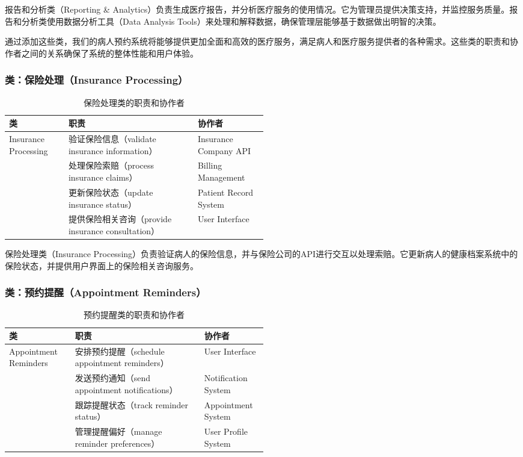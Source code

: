 报告和分析类（Reporting \& Analytics）负责生成医疗报告，并分析医疗服务的使用情况。它为管理员提供决策支持，并监控服务质量。报告和分析类使用数据分析工具（Data Analysis Tools）来处理和解释数据，确保管理层能够基于数据做出明智的决策。

通过添加这些类，我们的病人预约系统将能够提供更加全面和高效的医疗服务，满足病人和医疗服务提供者的各种需求。这些类的职责和协作者之间的关系确保了系统的整体性能和用户体验。

\subsubsection{类：保险处理（Insurance Processing）}
\begin{table}[htbp]
	\centering
	\begin{tabular}{|l|p{0.5\linewidth}|l|}
		\hline
		\textbf{类} & \textbf{职责} & \textbf{协作者} \\
		\hline
		Insurance Processing & 验证保险信息（validate insurance information） & Insurance Company API \\
		& 处理保险索赔（process insurance claims） & Billing Management \\
		& 更新保险状态（update insurance status） & Patient Record System \\
		& 提供保险相关咨询（provide insurance consultation） & User Interface \\
		\hline
	\end{tabular}
	\caption{保险处理类的职责和协作者}
	\label{tab:insurance_processing}
\end{table}

保险处理类（Insurance Processing）负责验证病人的保险信息，并与保险公司的API进行交互以处理索赔。它更新病人的健康档案系统中的保险状态，并提供用户界面上的保险相关咨询服务。

\subsubsection{类：预约提醒（Appointment Reminders）}
\begin{table}[htbp]
	\centering
	\begin{tabular}{|l|p{0.5\linewidth}|l|}
		\hline
		\textbf{类} & \textbf{职责} & \textbf{协作者} \\
		\hline
		Appointment Reminders & 安排预约提醒（schedule appointment reminders） & User Interface \\
		& 发送预约通知（send appointment notifications） & Notification System \\
		& 跟踪提醒状态（track reminder status） & Appointment System \\
		& 管理提醒偏好（manage reminder preferences） & User Profile System \\
		\hline
	\end{tabular}
	\caption{预约提醒类的职责和协作者}
	\label{tab:appointment_reminders}
\end{table}

